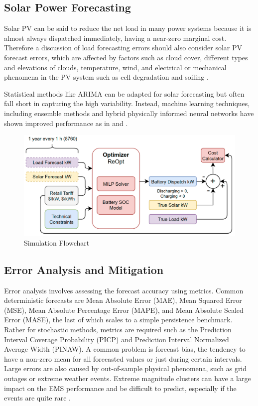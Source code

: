 \documentclass[conference]{IEEEtran}
\begin{document}
\subsection{Solar Power Forecasting}

Solar PV can be said to reduce the net load in many power systems because it is almost always dispatched immediately, having a near-zero marginal cost. Therefore a discussion of load forecasting errors should also consider solar PV forecast errors, which are affected by factors such as cloud cover, different types and elevations of clouds, temperature, wind, and electrical or mechanical phenomena in the PV system such as cell degradation and soiling \cite{leva2017analysis}. 

Statistical methods like ARIMA can be adapted for solar forecasting but often fall short in capturing the high variability. Instead, machine learning techniques, including ensemble methods and hybrid physically informed neural networks have shown improved performance as in \cite{yang2018history} and \cite{matera2024time}. 

\begin{figure}
    \centering
    \includegraphics[width=1\linewidth]{images/flowchart.png}
    \caption{Simulation Flowchart}
    \label{fig:flowchart}
\end{figure}

\subsection{Error Analysis and Mitigation}

Error analysis involves assessing the forecast accuracy using metrics. Common deterministic forecasts are Mean Absolute Error (MAE), Mean Squared Error (MSE),  Mean Absolute Percentage Error (MAPE), and Mean Absolute Scaled Error (MASE), the last of which scales to a simple persistence benchmark. Rather for stochastic methods, metrics are required such as the Prediction Interval Coverage Probability (PICP) and Prediction Interval Normalized Average Width (PINAW).  A common problem is forecast bias, the tendency to have a non-zero mean for all forecasted values or just during certain intervals. Large errors are also caused by out-of-sample physical phenomena, such as grid outages or extreme weather events. Extreme magnitude clusters can have a large impact on the EMS performance and be difficult to predict, especially if the events are quite rare \cite{cirillo2020tail}.
\end{document}
